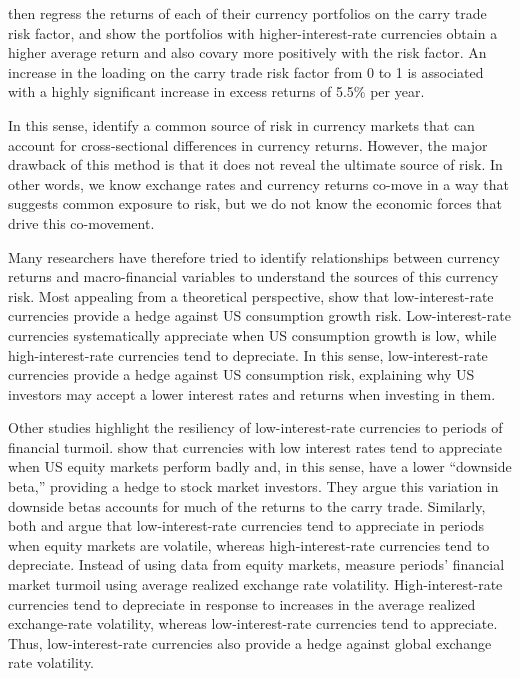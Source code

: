 \documentclass[11pt]{article}
\begin{document}
\citet{LustigRoussanovVerdelhan2011} then regress the returns of each of their currency portfolios on the carry trade risk factor, and show the portfolios with higher-interest-rate currencies obtain a higher average return and also covary more positively with the risk factor. An increase in the loading on the carry trade risk factor from 0 to 1 is associated with a highly significant increase in excess returns of 5.5\% per year.

In this sense, \citet{LustigRoussanovVerdelhan2011} identify a common source of risk in currency markets that can account for cross-sectional differences in currency returns. However, the major drawback of this method is that it does not reveal the ultimate source of risk. In other words, we know exchange rates and currency returns co-move in a way that suggests common exposure to risk, but we do not know the economic forces that drive this co-movement.

Many researchers have therefore tried to identify relationships between currency returns and macro-financial variables to understand the sources of this currency risk. Most appealing from a theoretical perspective, \citet{LustigVerdelhan2007} show that low-interest-rate currencies provide a hedge against US consumption growth risk. Low-interest-rate currencies systematically appreciate when US consumption growth is low, while high-interest-rate currencies tend to depreciate. In this sense, low-interest-rate currencies provide a hedge against US consumption risk, explaining why US investors may accept a lower interest rates and returns when investing in them.

Other studies highlight the resiliency of low-interest-rate currencies to periods of financial turmoil. \cite{lettau2014conditional} show that currencies with low interest rates tend to appreciate when US equity markets perform badly and, in this sense, have a lower ``downside beta,'' providing a hedge to stock market investors. They argue this variation in downside betas accounts for much of the returns to the carry trade. Similarly, both \citet{LustigRoussanovVerdelhan2011} and \citet{CampbellMedeirosViceira2010} argue that low-interest-rate currencies tend to appreciate in periods when equity markets are volatile, whereas high-interest-rate currencies tend to depreciate. Instead of using data from equity markets, \citet{Menkhoffetal2012} measure periods' financial market turmoil using average realized exchange rate volatility. High-interest-rate currencies tend to depreciate in response to increases in the average realized exchange-rate volatility, whereas low-interest-rate currencies tend to appreciate. Thus, low-interest-rate currencies also provide a hedge against global exchange rate volatility. 
\end{document}
